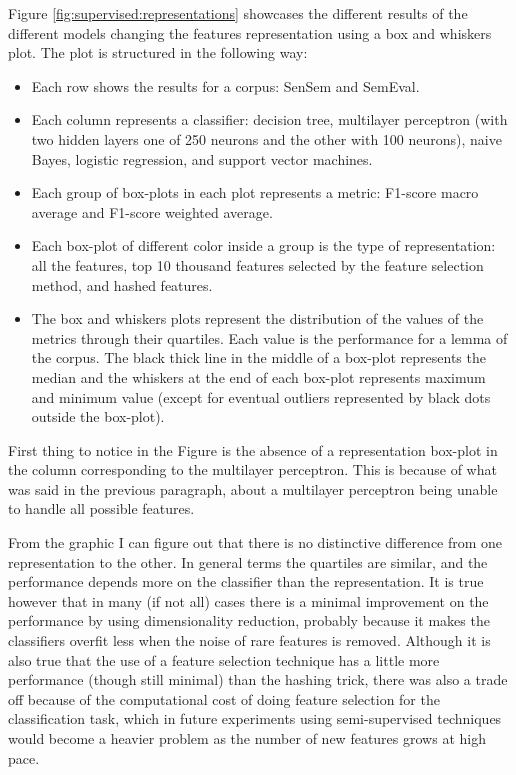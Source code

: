 Figure \ref{fig:supervised:representations} showcases the different results
of the different models changing the features representation using a box and
whiskers plot. The plot is structured in the following way: 

\begin{itemize}
  \item Each row shows the results for a corpus: SenSem and SemEval.
  \item Each column represents a classifier: decision tree, multilayer
    perceptron (with two hidden layers one of 250 neurons and the other with
    100 neurons), naive Bayes, logistic regression, and support vector
    machines.
  \item Each group of box-plots in each plot represents a metric: F1-score
    macro average and F1-score weighted average.
  \item Each box-plot of different color inside a group is the type of
    representation: all the features, top 10 thousand features selected by the
    feature selection method, and hashed features.
  \item The box and whiskers plots represent the distribution of the values of
    the metrics through their quartiles. Each value is the performance for a
    lemma of the corpus. The black thick line in the middle of a box-plot
    represents the median and the whiskers at the end of each box-plot
    represents maximum and minimum value (except for eventual outliers
    represented by black dots outside the box-plot).
\end{itemize}

First thing to notice in the Figure is the absence of a representation box-plot
in the column corresponding to the multilayer perceptron. This is because of
what was said in the previous paragraph, about a multilayer perceptron being
unable to handle all possible features.

From the graphic I can figure out that there is no distinctive difference from
one representation to the other. In general terms the quartiles are similar,
and the performance depends more on the classifier than the representation. It
is true however that in many (if not all) cases there is a minimal improvement
on the performance by using dimensionality reduction, probably because it makes
the classifiers overfit less when the noise of rare features is removed.
Although it is also true that the use of a feature selection technique has a
little more performance (though still minimal) than the hashing trick, there
was also a trade off because of the computational cost of doing feature
selection for the classification task, which in future experiments using
semi-supervised techniques would become a heavier problem as the number of new
features grows at high pace.

